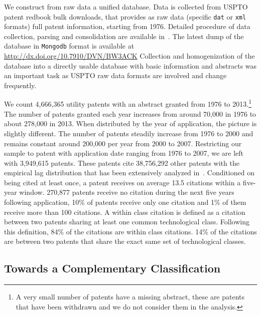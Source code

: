\documentclass[12pt,twoside,a4paper]{article}
\begin{document}
We construct from raw data a unified database. Data is collected from USPTO patent redbook bulk downloads, that provides as raw data (specific \texttt{dat} or \texttt{xml} formats) full patent information, starting from 1976. Detailed procedure of data collection, parsing and consolidation are available in~. The latest dump of the database in \texttt{Mongodb} format is available at %
\url{http://dx.doi.org/10.7910/DVN/BW3ACK} %
Collection and homogenization of the database into a directly usable database with basic information and abstracts was an important task as USPTO raw data formats are involved and change frequently.

We count 4,666,365 utility patents with an abstract granted from 1976 to 2013.\footnote{A very small number of patents have a missing abstract, these are patents that have been withdrawn and we do not consider them in the analysis.} The number of patents granted each year increases from around 70,000 in 1976 to about 278,000 in 2013. When distributed by the year of application, the picture is slightly different. The number of patents steadily increase from 1976 to 2000 and remains constant around 200,000 per year from 2000 to 2007. Restricting our sample to patent with application date ranging from 1976 to 2007, we are left with 3,949,615 patents. These patents cite 38,756,292 other patents with the empirical lag distribution that has been extensively analyzed in~\cite{Hall2001}. Conditioned on being cited at least once, a patent receives on average 13.5 citations within a five-year window. 270,877 patents receive no citation during the next five years following application, 10\% of patents receive only one citation and 1\% of them receive more than 100 citations. A within class citation is defined as a citation between two patents sharing at least one common technological class. Following this definition, 84\% of the citations are within class citations. 14\% of the citations are between two patents that share the exact same set of technological classes.


\subsection{Towards a Complementary Classification}
\end{document}
